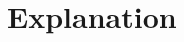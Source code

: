 \documentclass[journal,12pt,twocolumn]{IEEEtran}
\begin{document}
\section{Explanation}
%

%
%
\end{document}
